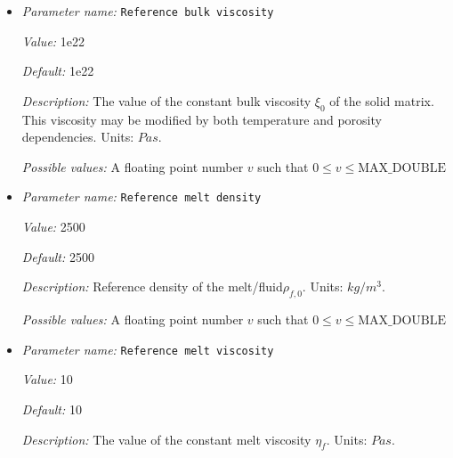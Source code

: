 \begin{itemize}
{\it Value:} 6e-8


{\it Default:} 6e-8


{\it Description:} The linear solidus temperature change with pressure. For positive values, the solidus gets increased for positive pressures. Units: $1/Pa$.


{\it Possible values:} A floating point number $v$ such that $-\text{MAX\_DOUBLE} \leq v \leq \text{MAX\_DOUBLE}$
\item {\it Parameter name:} {\tt Reference bulk viscosity}
\label{parameters:Material model/Melt global/Reference bulk viscosity}


{\it Value:} 1e22


{\it Default:} 1e22


{\it Description:} The value of the constant bulk viscosity $\xi_0$ of the solid matrix. This viscosity may be modified by both temperature and porosity dependencies. Units: $Pa s$.


{\it Possible values:} A floating point number $v$ such that $0 \leq v \leq \text{MAX\_DOUBLE}$
\item {\it Parameter name:} {\tt Reference melt density}
\label{parameters:Material model/Melt global/Reference melt density}


{\it Value:} 2500


{\it Default:} 2500


{\it Description:} Reference density of the melt/fluid$\rho_{f,0}$. Units: $kg/m^3$.


{\it Possible values:} A floating point number $v$ such that $0 \leq v \leq \text{MAX\_DOUBLE}$
\item {\it Parameter name:} {\tt Reference melt viscosity}
\label{parameters:Material model/Melt global/Reference melt viscosity}


{\it Value:} 10


{\it Default:} 10


{\it Description:} The value of the constant melt viscosity $\eta_f$. Units: $Pa s$.



\end{itemize}
